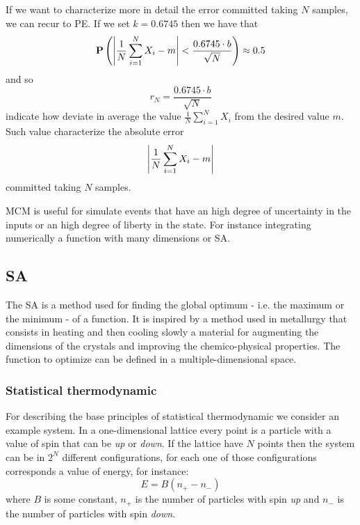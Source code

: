 \documentclass[dissertation.tex]{subfiles}
\begin{document}
If we want to characterize more in detail the error committed taking
$N$ samples, we can recur to \ac{PE}. If we set $k=0.6745$ then we
have that
\begin{equation*}
  \mathrm{\textbf{P}}\left(\left|\frac{1}{N}\sum_{i=1}^NX_i-m\right| <\frac{0.6745\cdot b}{\sqrt{N}}\right)\approx 0.5
\end{equation*}
and so
\begin{equation*}
  r_N = \frac{0.6745\cdot b}{\sqrt{N}}
\end{equation*}
indicate how deviate in average the value $\frac{1}{N}\sum_{i=1}^NX_i$
from the desired value $m$. Such value characterize the absolute error
\begin{equation*}
\left|\frac{1}{N}\sum_{i=1}^NX_i-m\right|  
\end{equation*}
committed taking $N$ samples.

\ac{MCM} is useful for simulate events that have an high degree of
uncertainty in the inputs or an high degree of liberty in the
state. For instance integrating numerically a function with many
dimensions or \ac{SA}.

\subsection{\acf{SA}}
The \ac{SA} is a method used for finding the global optimum - i.e. the
maximum or the minimum - of a function. It is inspired by a method
used in metallurgy that consists in heating and then cooling slowly a
material for augmenting the dimensions of the crystals and improving
the chemico-physical properties. The function to optimize can be
defined in a multiple-dimensional space.

\subsubsection{Statistical thermodynamic}
For describing the base principles of statistical thermodynamic we
consider an example system. In a one-dimensional lattice every point
is a particle with a value of spin that can be \emph{up} or
\emph{down}. If the lattice have $N$ points then the system can be in
$2^N$ different configurations, for each one of those configurations
corresponds a value of energy, for instance:
\begin{equation*}
  E=B(n_+-n_-)
\end{equation*}
where $B$ is some constant, $n_+$ is the number of particles with spin
\emph{up} and $n_-$ is the number of particles with spin \emph{down}.
\end{document}
